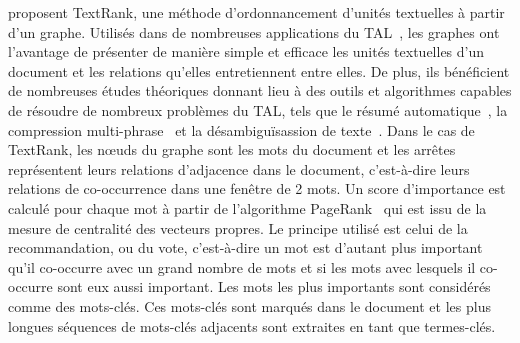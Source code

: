      proposent TextRank, une méthode
    d'ordonnancement d'unités textuelles à partir d'un graphe. Utilisés dans de
    nombreuses applications du TAL~\cite{kozareva2013textgraphs}, les graphes
    ont l'avantage de présenter de manière simple et efficace les unités
    textuelles d'un document et les relations qu'elles entretiennent entre
    elles. De plus, ils bénéficient de nombreuses études théoriques donnant lieu
    à des outils et algorithmes capables de résoudre de nombreux problèmes du
    TAL, tels que le résumé automatique~\cite{wan2007iterativereinforcement}, la
    compression multi-phrase~\cite{boudin2013multisentencecompression} et la
    désambiguïsassion de texte~\cite{schwab2013desambiguisation}. Dans le cas de
    TextRank, les n\oe{}uds du graphe sont les mots du document et les arrêtes
    représentent leurs relations d'adjacence dans le document, c'est-à-dire
    leurs relations de co-occurrence dans une fenêtre de 2 mots. Un score
    d'importance est calculé pour chaque mot à partir de l'algorithme
    PageRank~\cite{brin1998pagerank} qui est issu de la mesure de centralité des
    vecteurs propres. Le principe utilisé est celui de la recommandation, ou du
    vote, c'est-à-dire un mot est d'autant plus important qu'il co-occurre avec
    un grand nombre de mots et si les mots avec lesquels il co-occurre sont eux
    aussi important. Les mots les plus importants sont considérés comme des
    mots-clés. Ces mots-clés sont marqués dans le document et les plus longues
    séquences de mots-clés adjacents sont extraites en tant que termes-clés.

